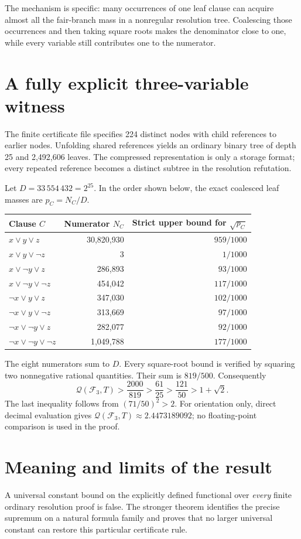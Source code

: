 \documentclass[11pt]{article}
\newcommand{\Q}{\mathcal Q}\newcommand{\F}{\mathcal F}
\begin{document}
The mechanism is specific: many occurrences of one leaf clause can acquire almost all the fair-branch mass in a nonregular resolution tree. Coalescing those occurrences and then taking square roots makes the denominator close to one, while every variable still contributes one to the numerator.

\clearpage
\section{A fully explicit three-variable witness}
The finite certificate file specifies 224 distinct nodes with child references to earlier nodes. Unfolding shared references yields an ordinary binary tree of depth 25 and 2,492,606 leaves. The compressed representation is only a storage format; every repeated reference becomes a distinct subtree in the resolution refutation.

Let $D=33\,554\,432=2^{25}$. In the order shown below, the exact coalesced leaf masses are $p_C=N_C/D$.
\begin{center}
\begin{tabular}{lrr}
\toprule
Clause $C$ & Numerator $N_C$ & Strict upper bound for $\sqrt{p_C}$\\
\midrule
$x\vee y\vee z$ & 30,820,930 & $959/1000$\\
$x\vee y\vee\neg z$ & 3 & $1/1000$\\
$x\vee\neg y\vee z$ & 286,893 & $93/1000$\\
$x\vee\neg y\vee\neg z$ & 454,042 & $117/1000$\\
$\neg x\vee y\vee z$ & 347,030 & $102/1000$\\
$\neg x\vee y\vee\neg z$ & 313,669 & $97/1000$\\
$\neg x\vee\neg y\vee z$ & 282,077 & $92/1000$\\
$\neg x\vee\neg y\vee\neg z$ & 1,049,788 & $177/1000$\\
\bottomrule
\end{tabular}
\end{center}
The eight numerators sum to $D$. Every square-root bound is verified by squaring two nonnegative rational quantities. Their sum is $819/500$. Consequently
\[
 \Q(\F_3,T)>\frac{2000}{819}>\frac{61}{25}>
 \frac{121}{50}>1+\sqrt2.
\]
The last inequality follows from $(71/50)^2>2$. For orientation only, direct decimal evaluation gives $\Q(\F_3,T)\approx2.4473189092$; no floating-point comparison is used in the proof.

\section{Meaning and limits of the result}
A universal constant bound on the explicitly defined functional over \emph{every} finite ordinary resolution proof is false. The stronger theorem identifies the precise supremum on a natural formula family and proves that no larger universal constant can restore this particular certificate rule.
\end{document}

